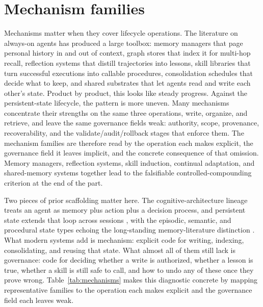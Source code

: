 \section{Mechanism families}\label{sec:mechanisms}


Mechanisms matter when they cover lifecycle operations. The literature on always-on agents has produced a large toolbox: memory managers that page personal history in and out of context, graph stores that index it for multi-hop recall, reflection systems that distill trajectories into lessons, skill libraries that turn successful executions into callable procedures, consolidation schedules that decide what to keep, and shared substrates that let agents read and write each other's state. Product by product, this looks like steady progress. Against the persistent-state lifecycle, the pattern is more uneven. Many mechanisms concentrate their strengths on the same three operations, write, organize, and retrieve, and leave the same governance fields weak: authority, scope, provenance, recoverability, and the validate/audit/rollback stages that enforce them. The mechanism families are therefore read by the operation each makes explicit, the governance field it leaves implicit, and the concrete consequence of that omission. Memory managers, reflection systems, skill induction, continual adaptation, and shared-memory systems together lead to the falsifiable controlled-compounding criterion at the end of the part.

Two pieces of prior scaffolding matter here. The cognitive-architecture lineage treats an agent as memory plus action plus a decision process, and persistent state extends that loop across sessions \citep{sumers2024cognitivearchitectureslanguageagents,yao2023reactsynergizingreasoningacting}, with the episodic, semantic, and procedural state types echoing the long-standing memory-literature distinction \citep{shinn2023reflexionlanguageagentsverbal}. What modern systems add is mechanism: explicit code for writing, indexing, consolidating, and reusing that state. What almost all of them still lack is governance: code for deciding whether a write is authorized, whether a lesson is true, whether a skill is still safe to call, and how to undo any of these once they prove wrong. Table~\ref{tab:mechanisms} makes this diagnostic concrete by mapping representative families to the operation each makes explicit and the governance field each leaves weak.

